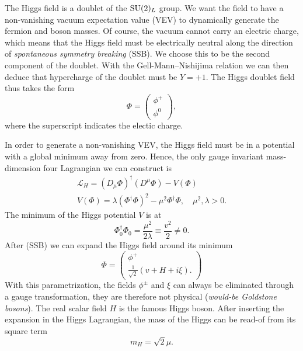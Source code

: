 The Higgs field is a doublet of the $\mathrm{SU}(2)_L$ group. We want the field to have a non-vanishing vacuum expectation value (\acs{VEV}) to dynamically generate the fermion and boson masses. Of course, the vacuum cannot carry an electric charge, which means that the Higgs field must be electrically neutral along the direction of \textit{spontaneous symmetry breaking} (\acs{SSB}). We choose this to be the second component of the doublet. With the Gell-Mann--Nishijima relation we can then deduce that hypercharge of the doublet must be $Y = +1$. The Higgs doublet field thus takes the form
\begin{equation}
\Phi = \begin{pmatrix}
  \phi^+ \\
  \phi^0
\end{pmatrix},
\end{equation}
where the superscript indicates the electic charge.

In order to generate a non-vanishing \acs{VEV}, the Higgs field must be in a potential with a global minimum away from zero. Hence, the only gauge invariant mass-dimension four Lagrangian we can construct is
\begin{equation}
\begin{gathered}
\mathcal{L}_H = \left( D_\mu \Phi \right)^\dagger \left( D^\mu \Phi \right) - V(\Phi) \\
V(\Phi) = \lambda (\Phi^\dagger \Phi )^2 - \mu^2 \Phi^\dagger \Phi, \quad \mu^2, \lambda > 0.
\end{gathered}
\end{equation}
The minimum of the Higgs potential $V$ is at
\begin{equation}
\Phi_0^\dagger \Phi_0 = \frac{\mu^2}{2 \lambda} \equiv \frac{v^2}{2} \neq 0.
\end{equation}
After (\acs{SSB}) we can expand the Higgs field around its minimum
\begin{equation}
\Phi = \begin{pmatrix}
  \phi^+ \\
  \frac{1}{\sqrt{2}} ( v + H + i \xi ).
\end{pmatrix}
\end{equation}
With this parametrization, the fields $\phi^\pm$ and $\xi$ can always be eliminated through a gauge transformation, they are therefore not physical (\textit{would-be Goldstone bosons}). The real scalar field $H$ is the famous Higgs boson. After inserting the expansion in the Higgs Lagrangian, the mass of the Higgs can be read-of from its square term
\begin{equation}
m_H = \sqrt{2} \mu.
\end{equation}

